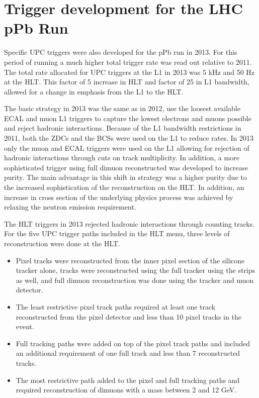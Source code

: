  \section{\label{sec:pPbTrigDev}Trigger development for the LHC pPb Run}
   Specific UPC triggers were also developed for the pPb run in 2013. 
    For this period of running a much higher total trigger rate was read out 
      relative to 2011.
    The total rate allocated for UPC triggers at the L1 in 2013 was 5 kHz and 
      50 Hz at the HLT.
    This factor of 5 increase in HLT and factor of 25 in L1 bandwidth,
      allowed for a change in emphasis from the L1 to the HLT. 

    The basic strategy in 2013 was the same as in 2012, use the loosest 
      available ECAL and muon L1 triggers \DIFdelbegin {}\DIFdelend to capture the lowest \pt{}
      electrons and muons possible and reject hadronic interactions.
    Because of the L1 bandwidth restrictions in 2011, both the ZDCs and the 
      BCSs were used on the L1 to reduce rates.
    In 2013 only the muon and ECAL triggers were used on the L1 allowing for 
      rejection of hadronic interactions through cuts on track multiplicity. 
    In addition, a more sophisticated trigger using full dimuon reconstructed 
      was developed to increase purity.
    The main advantage in this shift in strategy was a higher purity due to 
      the increased sophistication of the reconstruction on the HLT.
    In addition, an increase in cross section of the underlying physics process
      was achieved by relaxing the neutron emission requirement.

    The HLT triggers in 2013 rejected hadronic interactions through counting
      tracks. 
    For the five UPC trigger paths included in the HLT menu, 
      three levels of reconstruction were done at the HLT.

    \begin{itemize}
      \item Pixel tracks were reconstructed from the inner pixel section of the 
        silicone tracker alone, tracks were reconstructed using the full
        tracker using the strips as well, and full dimuon reconstruction was 
        done using the tracker and muon detector. 
      \item The least restrictive pixel track paths required at least 
        one track reconstructed from the pixel detector and less than 10 pixel 
        tracks in the event.
      \item Full tracking paths were added on top of the pixel track paths and included
        an additional requirement of one full track and less than 7 reconstructed
        tracks.
      \item The most restrictive path added to the pixel and full tracking paths and 
        required reconstruction of dimuons with a mass between 2 and 12 GeV.
    \end{itemize}

